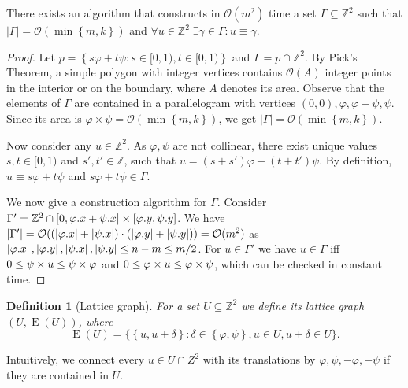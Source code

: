\documentclass[twoside,leqno]{article}
\newtheorem{definition}{Definition}[section]
\newcommand{\Z}{\mathbb{Z}}
\renewcommand{\O}{\mathcal{O}}
\renewcommand{\phi}{\varphi}
\newcommand{\set}[1]{\left\lbrace #1 \right\rbrace}
\newcommand{\bigset}[1]{\big \lbrace #1 \big \rbrace}
\DeclareMathOperator*{\Edges}{E}
\newcommand{\absolute}[1]{\left\lvert#1\right\rvert}
\begin{document}
\begin{lemma} \label{lattice_base}
	There exists an algorithm that constructs in $\O(m^2)$ time a set $\Gamma \subseteq \Z^2$ such that $\absolute{\Gamma} = \O(\min\set{m, k})$ and $\forall u \in \Z^2 \; \exists \gamma \in \Gamma : u \equiv \gamma$.
\end{lemma} 
	\begin{proof}
		Let $p = \set{s\phi + t\psi : s \in [0, 1), t \in [0, 1)}$ and $\Gamma = p \cap \Z^2$.
		By Pick's Theorem, a simple polygon with integer vertices contains $\O(A)$ integer points in the interior or on the boundary, where $A$ denotes its area.
		Observe that the elements of $\Gamma$ are contained in a parallelogram with vertices $(0, 0), \phi, \phi + \psi, \psi$.
		Since its area is $\phi \times \psi = \O(\min\set{m, k})$, we get $\absolute{\Gamma} = \O(\min\set{m, k})$.
		
		Now consider any $u \in \Z^2$.
		As $\phi, \psi$ are not collinear, there exist unique values $s, t \in [0, 1)$ and $s', t' \in \Z$, such that
		$u = (s + s') \phi + (t + t') \psi$.
		By definition, 
		$u \equiv s\phi + t\psi$ and $s\phi + t\psi \in \Gamma$.
		
		We now give a construction algorithm for $\Gamma$. Consider $\Gamma' = \Z^2 \cap [0,\x{\phi}+\x{\psi}] \times [\y{\phi},\y{\psi}]$. We have $\absolute{\Gamma'} = \O((\absolute{\x{\phi}}+\absolute{\x{\psi}}) \cdot (\absolute{\y{\phi}}+\absolute{\y{\psi}})) = \O(m^2)$ as $\absolute{\x{\phi}}, \absolute{\y{\phi}}, \absolute{\x{\psi}}, \absolute{\y{\psi}} \le n - m \le m / 2$. For $u \in \Gamma'$ we have $u \in \Gamma$ iff $0 \le \s{u} \le \s{\phi}$ and $0 \le \h{u} \le \h{\psi}$, which can be checked in constant time. 
	\end{proof}

\begin{definition}[Lattice graph]
	For a set $U \subseteq \Z^2$ we define its \emph{lattice graph} $(U, \Edges(U))$, where
$$\Edges(U) = \bigset{\set{u, u + \delta} : \delta \in \set{\phi, \psi}, u \in U, u + \delta \in U}.$$
\end{definition}
Intuitively, we connect every $u \in U \cap Z^2$ with its translations by $\phi, \psi, -\phi, -\psi$ if they are contained in $U$.
\end{document}
